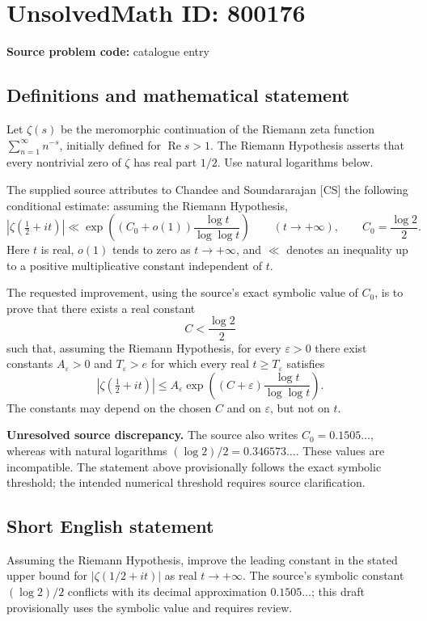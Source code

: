 \documentclass[11pt]{article}
\begin{document}
\section*{UnsolvedMath ID: 800176}
\textbf{Source problem code:} catalogue entry
\subsection{Definitions and mathematical statement}
Let \(\zeta(s)\) be the meromorphic continuation of the Riemann zeta function \(\sum_{n=1}^{\infty}n^{-s}\), initially defined for \(\operatorname{Re}s>1\). The Riemann Hypothesis asserts that every nontrivial zero of \(\zeta\) has real part \(1/2\). Use natural logarithms below.

The supplied source attributes to Chandee and Soundararajan [CS] the following conditional estimate: assuming the Riemann Hypothesis,
\[
\left|\zeta\!\left(\tfrac12+it\right)\right|
\ll \exp\!\left(\left(C_0+o(1)\right)\frac{\log t}{\log\log t}\right)
\qquad(t\to+\infty),
\qquad C_0=\frac{\log 2}{2}.
\]
Here \(t\) is real, \(o(1)\) tends to zero as \(t\to+\infty\), and \(\ll\) denotes an inequality up to a positive multiplicative constant independent of \(t\).

The requested improvement, using the source's exact symbolic value of \(C_0\), is to prove that there exists a real constant
\[
C<\frac{\log 2}{2}
\]
such that, assuming the Riemann Hypothesis, for every \(\varepsilon>0\) there exist constants \(A_{\varepsilon}>0\) and \(T_{\varepsilon}>e\) for which every real \(t\ge T_{\varepsilon}\) satisfies
\[
\left|\zeta\!\left(\tfrac12+it\right)\right|
\le A_{\varepsilon}\exp\!\left((C+\varepsilon)\frac{\log t}{\log\log t}\right).
\]
The constants may depend on the chosen \(C\) and on \(\varepsilon\), but not on \(t\).

\textbf{Unresolved source discrepancy.} The source also writes \(C_0=0.1505\ldots\), whereas with natural logarithms \((\log 2)/2=0.346573\ldots\). These values are incompatible. The statement above provisionally follows the exact symbolic threshold; the intended numerical threshold requires source clarification.
\subsection{Short English statement}
Assuming the Riemann Hypothesis, improve the leading constant in the stated upper bound for \(\lvert\zeta(1/2+it)\rvert\) as real \(t\to+\infty\). The source's symbolic constant \((\log 2)/2\) conflicts with its decimal approximation \(0.1505\ldots\); this draft provisionally uses the symbolic value and requires review.
\end{document}
